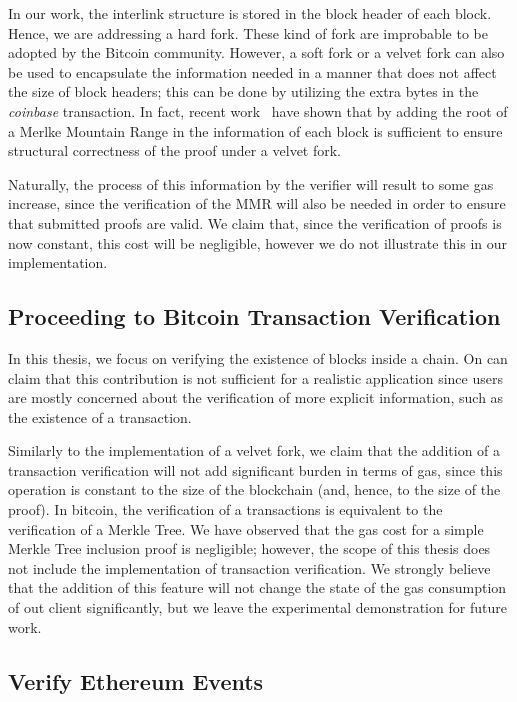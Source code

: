 In our work, the interlink structure is stored in the block header of each
block. Hence, we are addressing a hard fork. These kind of fork are improbable
to be adopted by the Bitcoin community. However, a soft fork or a velvet fork
can also be used to encapsulate the information needed in a manner that does
not affect the size of block headers; this can be done by utilizing the extra
bytes in the \emph{coinbase} transaction. In fact, recent
work~\cite{velvet-nipopows} have shown that by adding the root of a Merlke
Mountain Range in the information of each block is sufficient to ensure
structural correctness of the proof under a velvet fork.

Naturally, the process of this information by the verifier will result to some
gas increase, since the verification of the MMR will also be needed in order to
ensure that submitted proofs are valid. We claim that, since the verification
of proofs is now constant, this cost will be negligible, however we do not
illustrate this in our implementation.

\subsection{Proceeding to Bitcoin Transaction Verification}

In this thesis, we focus on verifying the existence of blocks inside a chain.
On can claim that this contribution is not sufficient for a realistic
application since users are mostly concerned about the verification of more
explicit information, such as the existence of a transaction.

Similarly to the implementation of a velvet fork, we claim that the addition of
a transaction verification will not add significant burden in terms of gas,
since this operation is constant to the size of the blockchain (and, hence, to
the size of the proof). In bitcoin, the verification of a transactions is
equivalent to the verification of a Merkle Tree. We have observed that the gas
cost for a simple Merkle Tree inclusion proof is negligible; however, the scope
of this thesis does not include the implementation of transaction verification.
We strongly believe that the addition of this feature will not change the state
of the gas consumption of out client significantly, but we leave the
experimental demonstration for future work.

\subsection{Verify Ethereum Events}


